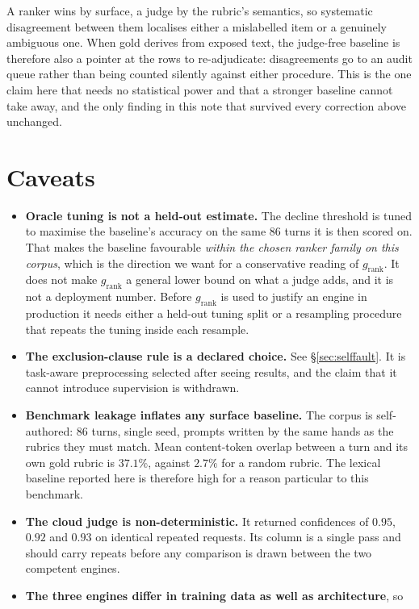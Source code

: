 \documentclass[10pt,twocolumn]{article}
\newcommand{\grank}{$g_{\mathrm{rank}}$}
\begin{document}
A ranker wins by surface, a judge by the rubric's semantics, so systematic disagreement
between them localises either a mislabelled item or a genuinely ambiguous one. When gold
derives from exposed text, the judge-free baseline is therefore also a pointer at the rows to
re-adjudicate: disagreements go to an audit queue rather than being counted silently against
either procedure. This is the one claim here that needs no statistical power and that a
stronger baseline cannot take away, and the only finding in this note that survived every
correction above unchanged.

\section{Caveats}\label{sec:caveats}
\begin{itemize}[topsep=2pt,itemsep=3pt,leftmargin=1.4em]
\item \textbf{Oracle tuning is not a held-out estimate.} The decline threshold is tuned to
maximise the baseline's accuracy on the same 86 turns it is then scored on. That makes the
baseline favourable \emph{within the chosen ranker family on this corpus}, which is the
direction we want for a conservative reading of \grank{}. It does not make \grank{} a general
lower bound on what a judge adds, and it is not a deployment number. Before \grank{} is used
to justify an engine in production it needs either a held-out tuning split or a resampling
procedure that repeats the tuning inside each resample.
\item \textbf{The exclusion-clause rule is a declared choice.} See \S\ref{sec:selffault}. It
is task-aware preprocessing selected after seeing results, and the claim that it cannot
introduce supervision is withdrawn.
\item \textbf{Benchmark leakage inflates any surface baseline.} The corpus is self-authored:
86 turns, single seed, prompts written by the same hands as the rubrics they must match. Mean
content-token overlap between a turn and its own gold rubric is $37.1\%$, against $2.7\%$ for
a random rubric. The lexical baseline reported here is therefore high for a reason particular
to this benchmark.
\item \textbf{The cloud judge is non-deterministic.} It returned confidences of $0.95$,
$0.92$ and $0.93$ on identical repeated requests. Its column is a single pass and should
carry repeats before any comparison is drawn between the two competent engines.
\item \textbf{The three engines differ in training data as well as architecture}, so

\end{itemize}
\end{document}
